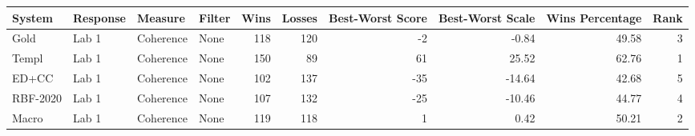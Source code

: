 \begin{tabular}{llllrrrrrr}
\toprule
System & Response & Measure & Filter & Wins & Losses & Best-Worst Score & Best-Worst Scale & Wins Percentage & Rank \\
\midrule
Gold & Lab 1 & Coherence & None & 118 & 120 & -2 & -0.84 & 49.58 & 3 \\
Templ & Lab 1 & Coherence & None & 150 & 89 & 61 & 25.52 & 62.76 & 1 \\
ED+CC & Lab 1 & Coherence & None & 102 & 137 & -35 & -14.64 & 42.68 & 5 \\
RBF-2020 & Lab 1 & Coherence & None & 107 & 132 & -25 & -10.46 & 44.77 & 4 \\
Macro & Lab 1 & Coherence & None & 119 & 118 & 1 & 0.42 & 50.21 & 2 \\
\bottomrule
\end{tabular}
